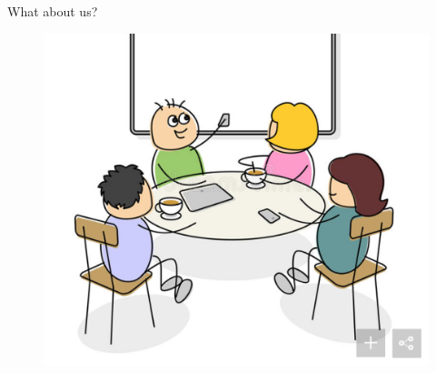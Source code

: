 \documentclass{beamer}\usepackage[]{graphicx}\usepackage[]{color}
\begin{document}
\begin{frame}
\vspace{5mm}
What about us?
\begin{figure}
   \includegraphics[scale=0.4]{../figures/lecture-welcome/table-cartoon.png}
\end{figure}
\small
\end{frame}
\end{document}
